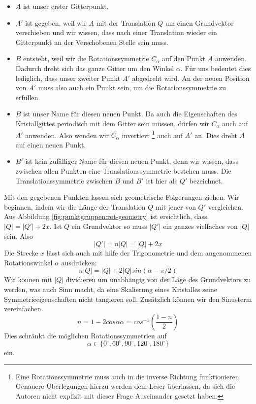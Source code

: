  \begin{itemize}
     \item  $A$ ist unser erster Gitterpunkt. 
            
     \item  $A'$ ist gegeben, weil wir $A$ mit der Translation $Q$ um einen Grundvektor verschieben und wir wissen, 
            dass nach einer Translation wieder ein Gitterpunkt an der Verschobenen Stelle sein muss.           
     \item $B$ entsteht, weil wir die Rotationssymmetrie $C_\alpha$ auf den Punkt $A$ anwenden.
            Dadurch dreht sich das ganze Gitter um den Winkel $\alpha$. 
            Für uns bedeutet dies lediglich, dass unser zweiter Punkt $A'$ abgedreht wird.
            An der neuen Position von $A'$ muss also auch ein Punkt sein, um die Rotationssymmetrie zu erfüllen.
      \item $B$ ist unser Name für diesen neuen Punkt. 
            Da auch die Eigenschaften des Kristallgittes periodisch mit dem Gitter sein müssen, dürfen wir $C_\alpha$ auch auf $A'$ anwenden.
            Also wenden wir $C_\alpha$ invertiert
            \footnote{Eine Rotationssymmetrie muss auch in die inverse Richtung funktionieren. 
            Genauere Überlegungen hierzu werden dem Leser überlassen, da sich die Autoren nicht explizit mit dieser Frage Auseinander gesetzt haben.} 
            auch auf $A'$ an. 
            Dies dreht $A$ auf einen neuen Punkt.
     \item $B'$ ist kein zufälliger Name für diesen neuen Punkt, denn wir wissen, dass zwischen allen Punkten eine Translationssymmetrie bestehen muss.
            Die Translationssymmetrie zwischen $B$ und $B'$ ist hier als $Q'$ bezeichnet.
 \end{itemize}  
 Mit den gegebenen Punkten lassen sich geometrische Folgerungen ziehen.
 Wir beginnen, indem wir die Länge der Translation $Q$ mit jener von $Q'$ vergleichen.
 Aus Abbildung \ref{fig:punktgruppen:rot-geometry} ist ersichtlich, dass $|Q| = |Q'|+ 2x$.
 Ist $Q$ ein Grundvektor so muss $|Q'|$ ein ganzes vielfaches von $|Q|$ sein. Also 
 \[
    |Q'| = n|Q| = |Q| + 2x
 \]
 Die Strecke $x$ lässt sich auch mit hilfe der Trigonometrie und dem angenommenen Rotationswinkel $\alpha$ ausdrücken:
 \[
    n|Q| = |Q| + 2|Q|sin(\alpha - \pi/2)
 \]
 Wir können mit $|Q|$ dividieren um unabhängig von der Läge des Grundvektors zu werden, 
 was auch Sinn macht, da eine Skalierung eines Kristalles seine Symmetrieeigenschaften nicht tangieren soll. 
 Zusätzlich können wir den Sinusterm vereinfachen.
 \[
     n = 1 - 2cos\alpha
     \alpha = cos^{-1}(\frac{1-n}{2})
 \]
 Dies schränkt die möglichen Rotationssymmetrien auf 
 \[
     \alpha \in \{ 0^\circ, 60^\circ, 90^\circ, 120^\circ, 180^\circ\}
 \]
ein.

